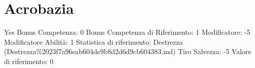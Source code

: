 \section{Acrobazia}\label{acrobazia}

\begin{description}
\tightlist
\item[Tags: ABI]
Yes Bonus Competenza: 0 Bonus Competenza di Riferimento: 1 Modificatore:
-5 Modificatore Abilità: 1 Statistica di riferimento: Destrezza
(Destrezza\%2023f7a96eab604de9b8d2d6d9cb604383.md) Tiro Salvezza: -5
Valore di riferimento: 0
\end{description}
